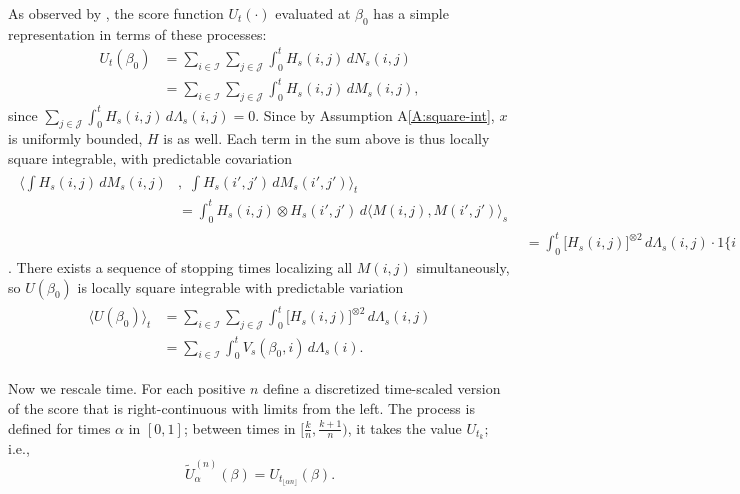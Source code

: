 \documentclass[final]{statsoc}
\begin{document}
As observed by \citet{andersen1982cox}, the score function
$U_t(\cdot)$ evaluated at $\beta_0$ has
a simple representation in terms of these processes:
\begin{align*}
    U_t(\beta_0)
        &=
        \sum_{i \in \mathcal{I}}
        \sum_{j \in \mathcal{J}}
        \int_0^t
            H_s(i,j) \, dN_s(i,j) \\
        &=
        \sum_{i \in \mathcal{I}}
        \sum_{j \in \mathcal{J}}
        \int_0^t
            H_s(i,j) \, dM_s(i,j),
\end{align*}
since
\(
    \sum_{j \in \mathcal{J}}
    \int_0^t
        H_s(i,j) \,
        d\Lambda_s(i,j)
    =
    0.
\)
Since by Assumption A\ref{A:square-int}, $x$ is uniformly bounded, $H$
is as well.  Each term in the sum above is thus locally square integrable,
with predictable covariation
\begin{align*}
    \begin{split}
        \bigg\langle
            \int
                H_s(i,j) \, dM_s(i,j)
        &, \, \,
            \int
                H_s(i',j') \, dM_s(i',j')
        \bigg\rangle_t \\
        &=
            \int_0^t
                H_s(i,j) \otimes H_s(i',j') \,
                d\big\langle M(i,j), M(i',j')\big\rangle_s
    \end{split} \\
        &=
            \int_0^t
                \big[ H_s(i,j) \big]^{\otimes 2} \,
                d\Lambda_s(i,j)
            \cdot
            1\{ i = i', j = j' \}
\end{align*}
\citep[Thm.~2.4.3]{fleming1991counting}.  There exists a sequence
of stopping times localizing all $M(i,j)$ simultaneously, so $U(\beta_0)$ is
locally square integrable with predictable variation
\begin{align}
\begin{split}\label{E:score-compensator}
    \big\langle U(\beta_0) \big\rangle_t
        &=
            \sum_{i \in \mathcal{I}}
            \sum_{j \in \mathcal{J}}
            \int_0^t
                \big[ H_s(i,j) \big]^{\otimes 2} \,
                d\Lambda_s(i,j) \\
        &=
            \sum_{i \in \mathcal{I}}
            \int_0^t
                V_s(\beta_0, i) \,
                d\Lambda_s(i).
\end{split}
\end{align}

Now we rescale time.  For each positive $n$ define a discretized time-scaled
version of the score that is right-continuous with limits from the left.
The process is defined for times $\alpha$ in $[0,1]$; between times in
$[\tfrac{k}{n}, \tfrac{k+1}{n})$, it takes the value $U_{t_k}$; i.e.,
\begin{equation}\label{E:score-time-scaled}
    \tilde U_{\alpha}^{(n)}(\beta)
        = U_{t_{\lfloor \alpha n \rfloor}}(\beta).
\end{equation}
\end{document}
